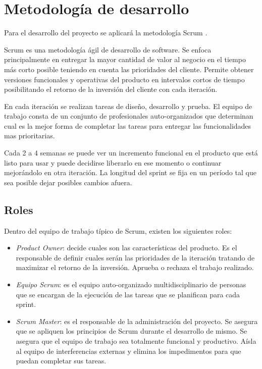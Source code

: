 \documentclass[12pt,a4paper]{article}
\begin{document}
	\section{Metodología de desarrollo}
	
	Para el desarrollo del proyecto se aplicará la metodología Scrum \cite{scrum}.

	Scrum es una metodología ágil de desarrollo de software. Se enfoca principalmente en entregar la mayor cantidad de valor al negocio en el tiempo más corto posible teniendo en cuenta las prioridades del cliente. Permite obtener versiones funcionales y operativas del producto en intervalos cortos de tiempo posibilitando el retorno de la inversión del cliente con cada iteración.
	
	En cada iteración se realizan tareas de diseño, desarrollo y prueba. El equipo de trabajo consta de un conjunto de profesionales auto-organizados que determinan cual es la mejor forma de completar las tareas para entregar las funcionalidades mas prioritarias.
	
	Cada 2 a 4 semanas se puede ver un incremento funcional en el producto que está listo para usar y puede decidirse liberarlo en ese momento o continuar mejorándolo en otra iteración. La longitud del sprint se fija en un período tal que sea posible dejar posibles cambios afuera.

	\subsection{Roles}

	Dentro del equipo de trabajo típico de Scrum, existen los siguientes roles:
	
	\begin{itemize}
	\item \textit{Product Owner}: decide cuales son las características del producto. Es el responsable de definir cuales serán las prioridades de la iteración tratando de maximizar el retorno de la inversión. Aprueba o rechaza el trabajo realizado.

	\item \textit{Equipo Scrum}: es el equipo auto-organizado multidisciplinario de personas que se encargan de la ejecución de las tareas que se planifican para cada sprint.

	\item \textit{Scrum Master}: es el responsable de la administración del proyecto. Se asegura que se apliquen los principios de Scrum durante el desarrollo de mismo. Se asegura que el equipo de trabajo sea totalmente funcional y productivo. Aísla al equipo de interferencias externas y elimina los impedimentos para que puedan completar sus tareas.
	
	\end{itemize}
\end{document}
